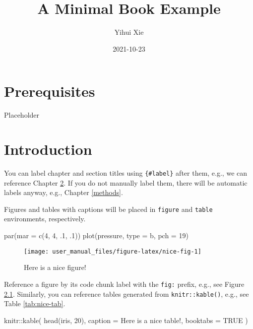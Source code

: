 \documentclass[
]{book}
\title{A Minimal Book Example}
\author{Yihui Xie}
\date{2021-10-23}
\newenvironment{Shaded}{\begin{snugshade}}{\end{snugshade}}
\newcommand{\AttributeTok}[1]{\textcolor[rgb]{0.77,0.63,0.00}{#1}}
\newcommand{\ConstantTok}[1]{\textcolor[rgb]{0.00,0.00,0.00}{#1}}
\newcommand{\DecValTok}[1]{\textcolor[rgb]{0.00,0.00,0.81}{#1}}
\newcommand{\FunctionTok}[1]{\textcolor[rgb]{0.00,0.00,0.00}{#1}}
\newcommand{\NormalTok}[1]{#1}
\newcommand{\SpecialCharTok}[1]{\textcolor[rgb]{0.00,0.00,0.00}{#1}}
\newcommand{\StringTok}[1]{\textcolor[rgb]{0.31,0.60,0.02}{#1}}
\begin{document}
\maketitle

{
\setcounter{tocdepth}{1}
\tableofcontents
}
\hypertarget{prerequisites}{%
\chapter{Prerequisites}\label{prerequisites}}

Placeholder

\hypertarget{intro}{%
\chapter{Introduction}\label{intro}}

You can label chapter and section titles using \texttt{\{\#label\}} after them, e.g., we can reference Chapter \ref{intro}. If you do not manually label them, there will be automatic labels anyway, e.g., Chapter \ref{methods}.

Figures and tables with captions will be placed in \texttt{figure} and \texttt{table} environments, respectively.

\begin{Shaded}
\begin{Highlighting}[]
\FunctionTok{par}\NormalTok{(}\AttributeTok{mar =} \FunctionTok{c}\NormalTok{(}\DecValTok{4}\NormalTok{, }\DecValTok{4}\NormalTok{, .}\DecValTok{1}\NormalTok{, .}\DecValTok{1}\NormalTok{))}
\FunctionTok{plot}\NormalTok{(pressure, }\AttributeTok{type =} \StringTok{\textquotesingle{}b\textquotesingle{}}\NormalTok{, }\AttributeTok{pch =} \DecValTok{19}\NormalTok{)}
\end{Highlighting}
\end{Shaded}

\begin{figure}

{\centering \texttt{[image: user\_manual\_files/figure-latex/nice-fig-1]} 

}

\caption{Here is a nice figure!}\label{fig:nice-fig}
\end{figure}

Reference a figure by its code chunk label with the \texttt{fig:} prefix, e.g., see Figure \ref{fig:nice-fig}. Similarly, you can reference tables generated from \texttt{knitr::kable()}, e.g., see Table \ref{tab:nice-tab}.

\begin{Shaded}
\begin{Highlighting}[]
\NormalTok{knitr}\SpecialCharTok{::}\FunctionTok{kable}\NormalTok{(}
  \FunctionTok{head}\NormalTok{(iris, }\DecValTok{20}\NormalTok{), }\AttributeTok{caption =} \StringTok{\textquotesingle{}Here is a nice table!\textquotesingle{}}\NormalTok{,}
  \AttributeTok{booktabs =} \ConstantTok{TRUE}
\NormalTok{)}
\end{Highlighting}
\end{Shaded}
\end{document}
